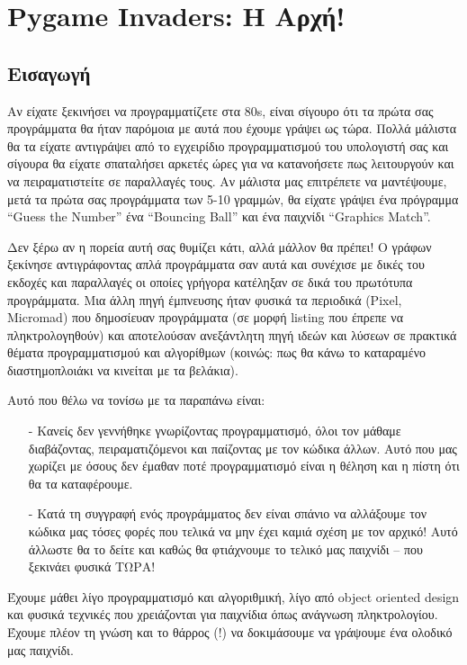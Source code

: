 \chapter{Pygame Invaders: Η Αρχή!}
\label{chap:pygame-invaders-start}
\section{Εισαγωγή}
Αν είχατε ξεκινήσει να προγραμματίζετε στα 80s, είναι σίγουρο ότι τα πρώτα σας προγράμματα θα ήταν παρόμοια με αυτά που έχουμε γράψει ως τώρα. Πολλά μάλιστα θα τα είχατε αντιγράψει από το εγχειρίδιο προγραμματισμού του υπολογιστή σας και σίγουρα θα είχατε σπαταλήσει αρκετές ώρες για να κατανοήσετε πως λειτουργούν και να πειραματιστείτε σε παραλλαγές τους. Αν μάλιστα μας επιτρέπετε να μαντέψουμε, μετά τα πρώτα σας προγράμματα των 5-10 γραμμών, θα είχατε γράψει ένα πρόγραμμα ``Guess the Number'' ένα ``Bouncing Ball'' και ένα παιχνίδι ``Graphics Match''.

Δεν ξέρω αν η πορεία αυτή σας θυμίζει κάτι, αλλά μάλλον θα πρέπει! Ο γράφων ξεκίνησε αντιγράφοντας απλά προγράμματα σαν αυτά και συνέχισε με δικές του εκδοχές και παραλλαγές οι οποίες γρήγορα κατέληξαν σε δικά του πρωτότυπα προγράμματα. Μια άλλη πηγή έμπνευσης ήταν φυσικά τα περιοδικά (Pixel, Micromad) που δημοσίευαν προγράμματα (σε μορφή listing που έπρεπε να πληκτρολογηθούν) και αποτελούσαν ανεξάντλητη πηγή ιδεών και λύσεων σε πρακτικά θέματα προγραμματισμού και αλγορίθμων (κοινώς: πως θα κάνω το καταραμένο διαστημοπλοιάκι να κινείται με τα βελάκια).

Αυτό που θέλω να τονίσω με τα παραπάνω είναι:
%
\begin{itemize}
\item [-] Κανείς δεν γεννήθηκε γνωρίζοντας προγραμματισμό, όλοι τον μάθαμε διαβάζοντας, πειραματιζόμενοι και παίζοντας με τον κώδικα άλλων. Αυτό που μας χωρίζει με όσους δεν έμαθαν ποτέ προγραμματισμό είναι η θέληση και η πίστη ότι θα τα καταφέρουμε.

\item [-] Κατά τη συγγραφή ενός προγράμματος δεν είναι σπάνιο να αλλάξουμε τον κώδικα μας τόσες φορές που τελικά να μην έχει καμιά σχέση με τον αρχικό! Αυτό άλλωστε θα το δείτε και καθώς θα φτιάχνουμε το τελικό μας παιχνίδι -- που ξεκινάει φυσικά ΤΩΡΑ!
\end{itemize}
%
Έχουμε μάθει λίγο προγραμματισμό και αλγοριθμική, λίγο από object oriented design και φυσικά τεχνικές που χρειάζονται για παιχνίδια όπως ανάγνωση πληκτρολογίου. Έχουμε πλέον τη γνώση και το θάρρος (!) να δοκιμάσουμε να γράψουμε ένα ολοδικό μας παιχνίδι.

